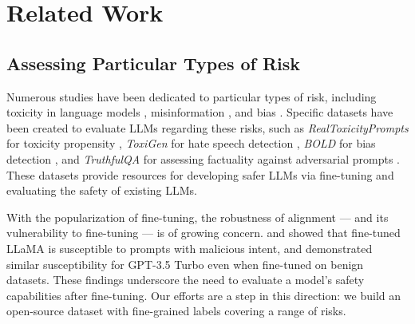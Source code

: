 \section{Related Work}






\subsection{Assessing Particular Types of Risk}

Numerous studies have been dedicated to particular types of risk, including toxicity in language models \citep{hartvigsen-etal-2022-toxigen, roller-etal-2021-recipes}, misinformation \citep{van2022misinformation, wang2023factcheckgpt, wang-etal-2024-m4}, and bias \citep{han-etal-2021-diverse,dhamala2021bold}. Specific datasets have been created to evaluate LLMs regarding these risks, such as \emph{RealToxicityPrompts} for toxicity propensity \citep{gehman-etal-2020-realtoxicityprompts}, \emph{ToxiGen} for hate speech detection \citep{hartvigsen-etal-2022-toxigen}, \emph{BOLD} for bias detection \citep{dhamala2021bold}, and \emph{TruthfulQA} for assessing factuality against adversarial prompts \citep{lin-etal-2022-truthfulqa}. These datasets provide resources for developing safer LLMs via fine-tuning and evaluating the safety of existing LLMs.

With the popularization of fine-tuning, the robustness of alignment --- and its vulnerability to fine-tuning --- is of growing concern. \citet{Wolf2023FundamentalLO} and \citet{gade2023badllama} showed that fine-tuned LLaMA  is susceptible to prompts with malicious intent, and \citet{Qi2023FinetuningAL} demonstrated similar susceptibility for GPT-3.5 Turbo even when fine-tuned on benign datasets. These findings underscore the need to evaluate a model's safety capabilities after fine-tuning. Our efforts are a step in this direction: we build an open-source dataset with fine-grained labels covering a range of risks.

